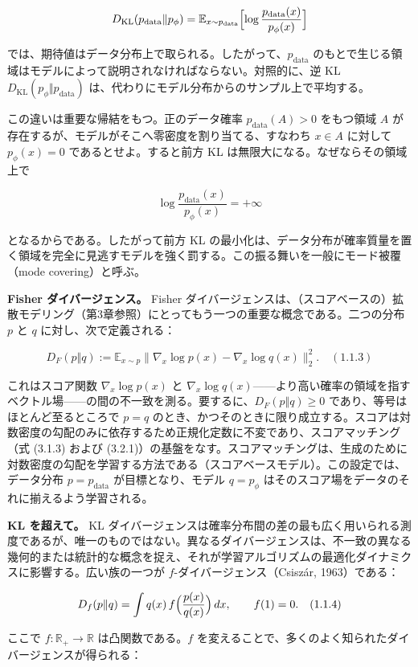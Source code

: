 \[
D_{\mathrm{KL}}(p_{\mathrm{data}} \Vert p_\phi)
= \mathbb{E}_{x\sim p_{\mathrm{data}}}\Bigl[\log \frac{p_{\mathrm{data}}(x)}{p_\phi(x)}\Bigr]
\]


では、期待値はデータ分布上で取られる。したがって、$p_{\mathrm{data}}$ のもとで生じる領域はモデルによって説明されなければならない。対照的に、逆 KL $D_{\mathrm{KL}}(p_\phi \Vert p_{\mathrm{data}})$ は、代わりにモデル分布からのサンプル上で平均する。

この違いは重要な帰結をもつ。正のデータ確率 $p_{\mathrm{data}}(A) > 0$ をもつ領域 $A$ が存在するが、モデルがそこへ零密度を割り当てる、すなわち $x \in A$ に対して $p_\phi(x) = 0$ であるとせよ。すると前方 KL は無限大になる。なぜならその領域上で

\[
\log \frac{p_{\mathrm{data}}(x)}{p_\phi(x)} = +\infty
\]


となるからである。したがって前方 KL の最小化は、データ分布が確率質量を置く領域を完全に見逃すモデルを強く罰する。この振る舞いを一般にモード被覆（mode covering）と呼ぶ。

\textbf{Fisher ダイバージェンス。} Fisher ダイバージェンスは、（スコアベースの）拡散モデリング（第3章参照）にとってもう一つの重要な概念である。二つの分布 $p$ と $q$ に対し、次で定義される：

\[
D_F(p\Vert q) := \mathbb{E}_{x\sim p}\bigl\|\nabla_x \log p(x) - \nabla_x \log q(x)\bigr\|_2^2. \quad (1.1.3)
\]


これはスコア関数 $\nabla_x \log p(x)$ と $\nabla_x \log q(x)$——より高い確率の領域を指すベクトル場——の間の不一致を測る。要するに、$D_F(p\Vert q) \ge 0$ であり、等号はほとんど至るところで $p = q$ のとき、かつそのときに限り成立する。スコアは対数密度の勾配のみに依存するため正規化定数に不変であり、スコアマッチング（式 (3.1.3) および (3.2.1)）の基盤をなす。スコアマッチングは、生成のために対数密度の勾配を学習する方法である（スコアベースモデル）。この設定では、データ分布 $p = p_{\mathrm{data}}$ が目標となり、モデル $q = p_\phi$ はそのスコア場をデータのそれに揃えるよう学習される。

\textbf{KL を超えて。} KL ダイバージェンスは確率分布間の差の最も広く用いられる測度であるが、唯一のものではない。異なるダイバージェンスは、不一致の異なる幾何的または統計的な概念を捉え、それが学習アルゴリズムの最適化ダイナミクスに影響する。広い族の一つが $f$-ダイバージェンス（Csiszár, 1963）である：

\[
D_f(p\Vert q) = \int q(x)\, f\Bigl(\frac{p(x)}{q(x)}\Bigr)\, dx, \qquad f(1) = 0. \quad (1.1.4)
\]


ここで $f : \mathbb{R}_+ \to \mathbb{R}$ は凸関数である。$f$ を変えることで、多くのよく知られたダイバージェンスが得られる：

